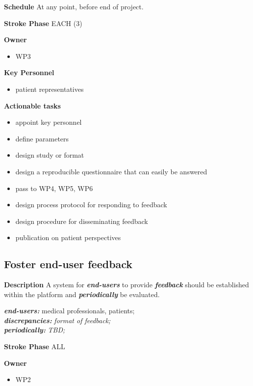 \documentclass[
  letterpaper,
  DIV=11,
  numbers=noendperiod]{scrreport}
\providecommand{\tightlist}{%
  \setlength{\itemsep}{0pt}\setlength{\parskip}{0pt}}\usepackage{longtable,booktabs,array}
\begin{document}
\textbf{Schedule} At any point, before end of project.

\textbf{Stroke Phase} EACH (3)

\textbf{Owner}

\begin{itemize}
\tightlist
\item
  WP3
\end{itemize}

\textbf{Key Personnel}

\begin{itemize}
\tightlist
\item
  patient representatives
\end{itemize}

\textbf{Actionable tasks}

\begin{itemize}
\tightlist
\item
  appoint key personnel
\item
  define parameters
\item
  design study or format
\item
  design a reproducible questionnaire that can easily be answered
\item
  pass to WP4, WP5, WP6
\item
  design process protocol for responding to feedback
\item
  design procedure for disseminating feedback
\item
  publication on patient perspectives
\end{itemize}

\hypertarget{foster-end-user-feedback}{%
\subsection{Foster end-user feedback}\label{foster-end-user-feedback}}

\textbf{Description} A system for \textbf{\emph{end-users}} to provide
\textbf{\emph{feedback}} should be established within the platform and
\textbf{\emph{periodically}} be evaluated.

\textbf{\emph{end-users:}} medical professionals, patients;\\
\textbf{\emph{discrepancies:}} \emph{format of feedback;}\\
\textbf{\emph{periodically:}} \emph{TBD;}

\textbf{Stroke Phase} ALL

\textbf{Owner}

\begin{itemize}
\tightlist
\item
  WP2
\end{itemize}
\end{document}
